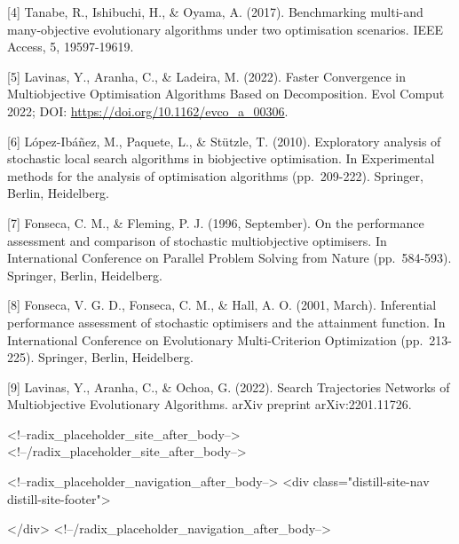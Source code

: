\documentclass[
]{article}
\begin{document}
{[}4{]} Tanabe, R., Ishibuchi, H., \& Oyama, A. (2017). Benchmarking
multi-and many-objective evolutionary algorithms under two optimisation
scenarios. IEEE Access, 5, 19597-19619.

{[}5{]} Lavinas, Y., Aranha, C., \& Ladeira, M. (2022). Faster
Convergence in Multiobjective Optimisation Algorithms Based on
Decomposition. Evol Comput 2022; DOI:
\url{https://doi.org/10.1162/evco_a_00306}.

{[}6{]} López-Ibáñez, M., Paquete, L., \& Stützle, T. (2010).
Exploratory analysis of stochastic local search algorithms in
biobjective optimisation. In Experimental methods for the analysis of
optimisation algorithms (pp.~209-222). Springer, Berlin, Heidelberg.

{[}7{]} Fonseca, C. M., \& Fleming, P. J. (1996, September). On the
performance assessment and comparison of stochastic multiobjective
optimisers. In International Conference on Parallel Problem Solving from
Nature (pp.~584-593). Springer, Berlin, Heidelberg.

{[}8{]} Fonseca, V. G. D., Fonseca, C. M., \& Hall, A. O. (2001, March).
Inferential performance assessment of stochastic optimisers and the
attainment function. In International Conference on Evolutionary
Multi-Criterion Optimization (pp.~213-225). Springer, Berlin,
Heidelberg.

{[}9{]} Lavinas, Y., Aranha, C., \& Ochoa, G. (2022). Search
Trajectories Networks of Multiobjective Evolutionary Algorithms. arXiv
preprint arXiv:2201.11726.

<!--radix_placeholder_site_after_body-->
<!--/radix_placeholder_site_after_body-->

<!--radix_placeholder_navigation_after_body-->
<div class="distill-site-nav distill-site-footer">

</div>
<!--/radix_placeholder_navigation_after_body-->
\end{document}
